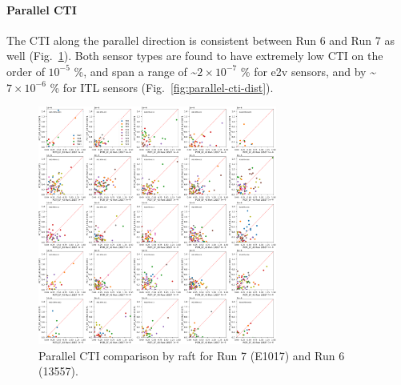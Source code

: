 \paragraph{Parallel CTI}\label{parallel-cti}

The CTI along the parallel direction is consistent between Run 6 and
Run 7 as well (Fig.~\ref{fig:parallel-cti}). Both sensor types are found to have extremely low CTI on the order of $10^{-5}$ \%,
and span a range of \textasciitilde$2 \times 10^{-7}$ \% for e2v sensors, and
by \textasciitilde$7 \times 10^{-6}$ \% for ITL sensors (Fig.~\ref{fig:parallel-cti-dist}).

\begin{figure}[H]
\begin{centering}
\includegraphics[width=0.7\textwidth]{figures/baselineCharacterization/13557_E1071_PCTI_EF_43.png}
\caption{Parallel CTI comparison by raft for Run 7 (E1017) and Run 6 (13557).}
\label{fig:parallel-cti}
\end{centering}
\end{figure}

